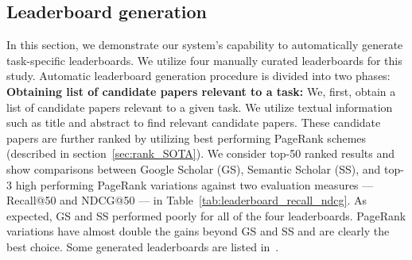 \documentclass[runningheads]{llncs}
\begin{document}
\begin{table}[th]
  \caption{Recall@50 and NDCG@50 measures for four leaderboards. Green cells indicate best scores and red cells indicate worst scores.}
  \label{tab:leaderboard_recall_ndcg}
\end{table}


\subsection{Leaderboard generation}

In this section, we demonstrate our system's capability to automatically generate task-specific leaderboards. We utilize four manually curated leaderboards for this study. Automatic leaderboard generation procedure is divided into two phases:\\
\noindent \textbf{Obtaining list of candidate papers relevant to a task:}
We, first, obtain a list of candidate papers relevant to a given task. We utilize textual information such as title and abstract to find relevant candidate papers. These candidate papers are further ranked by utilizing best performing PageRank schemes (described in section~\ref{sec:rank_SOTA}). We consider top-50 ranked results and show comparisons between Google Scholar (GS), Semantic Scholar (SS), and top-3 high performing PageRank variations against two evaluation measures --- Recall@50 and NDCG@50 ---  in Table~\ref{tab:leaderboard_recall_ndcg}. As expected, GS and SS performed poorly for all of the four leaderboards. PageRank variations have almost double the gains beyond GS and SS and are clearly the best choice.   Some generated leaderboards are listed in~\citet{SinghSVGMC2019TabCite}.
\end{document}
